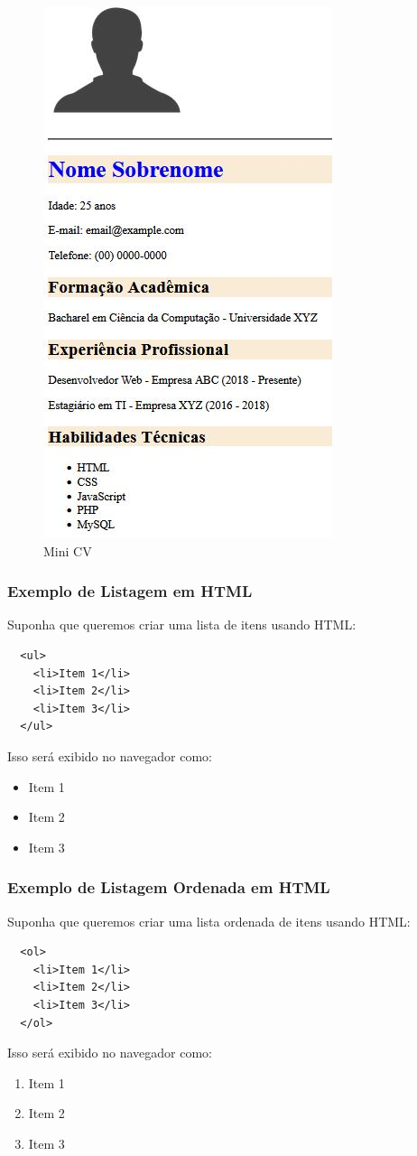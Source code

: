 \documentclass{beamer}
\begin{document}
\begin{frame}
\begin{figure}
    \centering
    \includegraphics[width=0.4\linewidth]{print-pag.JPG}
    \caption{Mini CV}
    \label{fig:enter-label}
\end{figure}
    
\end{frame}


\begin{frame}[fragile] %
  \frametitle{Exemplo de Listagem em HTML}
  Suponha que queremos criar uma lista de itens usando HTML:
  \begin{verbatim}
  <ul>
    <li>Item 1</li>
    <li>Item 2</li>
    <li>Item 3</li>
  </ul>
  \end{verbatim}
  Isso será exibido no navegador como:
  \begin{itemize}
    \item Item 1
    \item Item 2
    \item Item 3
  \end{itemize}
\end{frame}

\begin{frame}[fragile] %
  \frametitle{Exemplo de Listagem Ordenada em HTML}

  Suponha que queremos criar uma lista ordenada de itens usando HTML:

  \begin{verbatim}
  <ol>
    <li>Item 1</li>
    <li>Item 2</li>
    <li>Item 3</li>
  </ol>
  \end{verbatim}

  Isso será exibido no navegador como:

  \begin{enumerate}
    \item Item 1
    \item Item 2
    \item Item 3
  \end{enumerate}
\end{frame}
\end{document}
